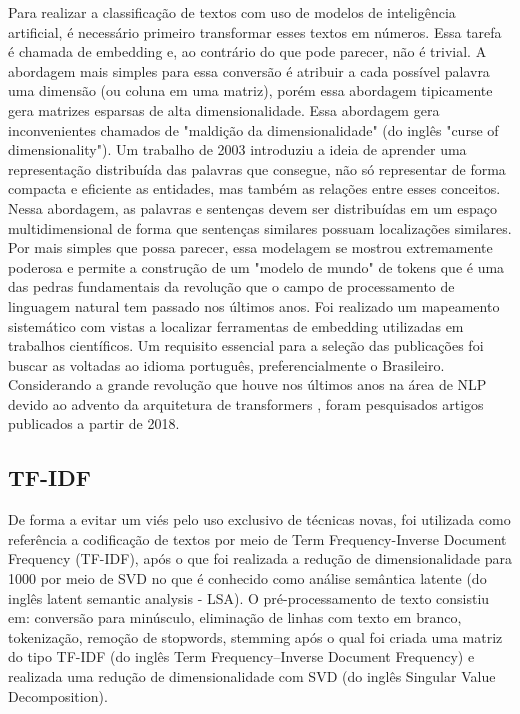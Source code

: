\documentclass[conference]{IEEEtran}
\begin{document}
  Para realizar a classificação de textos com uso de modelos de inteligência artificial, é necessário primeiro transformar esses textos em números. Essa tarefa é chamada de embedding e, ao contrário do que pode parecer, não é trivial. A abordagem mais simples para essa conversão é atribuir a cada possível palavra uma dimensão (ou coluna em uma matriz), porém essa abordagem tipicamente gera matrizes esparsas de alta dimensionalidade. Essa abordagem gera inconvenientes chamados de "maldição da dimensionalidade" (do inglês "curse of dimensionality"). Um trabalho de 2003 \cite{bengio2003} introduziu a ideia de aprender uma representação distribuída das palavras que consegue, não só representar de forma compacta e eficiente as entidades, mas também as relações entre esses conceitos. Nessa abordagem, as palavras e sentenças devem ser distribuídas em um espaço multidimensional de forma que sentenças similares possuam localizações similares. Por mais simples que possa parecer, essa modelagem se mostrou extremamente poderosa e permite a construção de um "modelo de mundo" de tokens que é uma das pedras fundamentais da revolução que o campo de processamento de linguagem natural tem passado nos últimos anos.
  Foi realizado um mapeamento sistemático com vistas a localizar ferramentas de embedding utilizadas em trabalhos científicos. Um requisito essencial para a seleção das publicações foi buscar as voltadas ao idioma português, preferencialmente o Brasileiro. Considerando a grande revolução que houve nos últimos anos na área de NLP devido ao advento da arquitetura de transformers \cite{NIPS2017_3f5ee243}, foram pesquisados artigos publicados a partir de 2018.

\subsection{TF-IDF}

  De forma a evitar um viés pelo uso exclusivo de técnicas novas, foi utilizada como referência a codificação de textos por meio de Term Frequency-Inverse Document Frequency (TF-IDF), após o que foi realizada a redução de dimensionalidade para 1000 por meio de SVD no que é conhecido como análise semântica latente (do inglês latent semantic analysis - LSA).  O pré-processamento de texto consistiu em: conversão para minúsculo, eliminação de linhas com texto em branco, tokenização, remoção de stopwords, stemming após o qual foi criada uma matriz do tipo TF-IDF (do inglês Term Frequency–Inverse Document Frequency) e realizada uma redução de dimensionalidade com SVD (do inglês Singular Value Decomposition).
\end{document}
